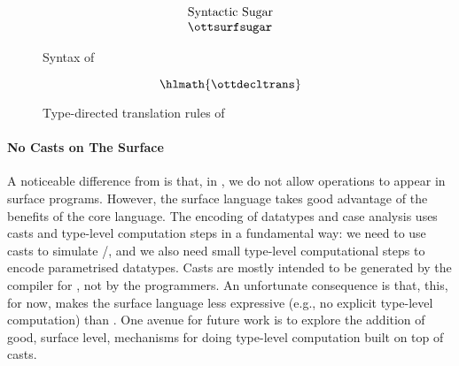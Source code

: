 {
\begin{figure}[t]
\footnotesize
\centering
\begin{spacing}{0.9}
\gram{\ottpgm\ottinterrule
\ottdecl\ottinterrule
\ottu\ottinterrule
\ottp\ottinterrule
\ottE\ottinterrule
\ottGs}
\[
    \begin{array}{l}
    \text{Syntactic Sugar} \\
    \ottsurfsugar \end{array}\]
\end{spacing}
\caption{Syntax of \sufcc}
\label{fig:surface:syntax}
\end{figure}
}

\begin{figure}[htpb]
\small
\ottdefnctxtrans{}\ottinterrule
\ottdefnpgmtrans{}\ottinterrule
\ottdefndecltrans{}
\[\hlmath{\ottdecltrans}\]\ottinterrule %
\ottdefnpattrans{}\ottinterrule
\ottdefnexprtrans{}
\caption{Type-directed translation rules of \sufcc}
\label{fig:source:translate}
\end{figure}

\paragraph{No Casts on The Surface}
A noticeable difference from \name is that, in \sufcc, we do not allow
\cast operations to appear in surface programs. However, the surface
language takes good advantage of the benefits of the core
language. The encoding of datatypes and case analysis uses casts and
type-level computation steps in a fundamental way: we need to use
casts to simulate \fold/\unfold, and we also need small type-level
computational steps to encode parametrised datatypes. Casts are mostly
intended to be generated by the compiler for \sufcc, not by the
programmers. An unfortunate consequence is that, this, for now, makes
the surface language less expressive (e.g., no explicit type-level
computation) than \name. One avenue for future work is to explore the
addition of good, surface level, mechanisms for doing type-level
computation built on top of casts.

